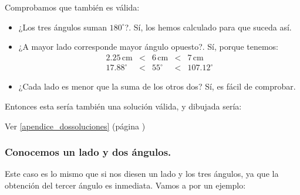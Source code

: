 \documentclass[a4paper,11pt,answers]{exam}
\newcommand{\degree}{^\circ}
\newcommand\unidad[1]{\,\text{#1}}
\begin{document}
\begin{solution}
\begin{itemize}
    Comprobamos que también es válida:
    \begin{itemize}
    \item ¿Los tres ángulos suman $180\degree$?. Sí, los hemos calculado para que suceda así.
    \item ¿A mayor lado corresponde mayor ángulo opuesto?. Sí, porque tenemos:
      \[
        \begin{array}{rcrcr}
          2.25\unidad{cm}&<&6\unidad{cm}&<&7\unidad{cm}\\
          17.88\degree&<&55\degree&<&107.12\degree
        \end{array}
      \]
    \item ¿Cada lado es menor que la suma de los otros dos? Sí, es fácil de comprobar.
    \end{itemize}
    Entonces esta sería también una solución válida, y dibujada sería:
    \begin{center}
  \end{center}
  \end{itemize}
  Ver \ref{apendice_dossoluciones} (página \pageref{apendice_dossoluciones})
\end{solution}

\subsubsection{Conocemos un lado y dos ángulos.}
Este caso es lo mismo que si nos diesen un lado y los tres ángulos,
ya que la obtención del tercer ángulo es inmediata.
Vamos a por un ejemplo:\\
\end{document}
